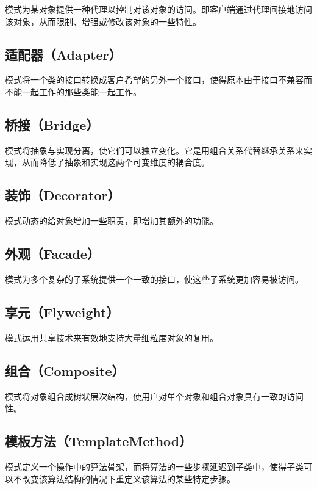 \documentclass[cn,black,12pt,normal]{elegantnote}
\begin{document}
模式为某对象提供一种代理以控制对该对象的访问。即客户端通过代理间接地访问该对象，从而限制、增强或修改该对象的一些特性。

\subsection{适配器（Adapter）}

模式将一个类的接口转换成客户希望的另外一个接口，使得原本由于接口不兼容而不能一起工作的那些类能一起工作。

\subsection{桥接（Bridge）}

模式将抽象与实现分离，使它们可以独立变化。它是用组合关系代替继承关系来实现，从而降低了抽象和实现这两个可变维度的耦合度。

\subsection{装饰（Decorator）}

模式动态的给对象增加一些职责，即增加其额外的功能。

\subsection{外观（Facade）}

模式为多个复杂的子系统提供一个一致的接口，使这些子系统更加容易被访问。

\subsection{享元（Flyweight）}

模式运用共享技术来有效地支持大量细粒度对象的复用。


\subsection{组合（Composite）}

模式将对象组合成树状层次结构，使用户对单个对象和组合对象具有一致的访问性。

\subsection{模板方法（TemplateMethod）}

模式定义一个操作中的算法骨架，而将算法的一些步骤延迟到子类中，使得子类可以不改变该算法结构的情况下重定义该算法的某些特定步骤。
\end{document}

